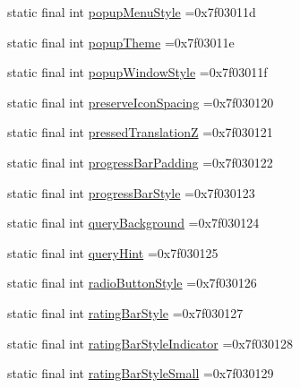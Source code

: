 \begin{DoxyCompactItemize}
static final int \mbox{\hyperlink{classbr_1_1unb_1_1cic_1_1mp_1_1marketmaster_1_1test_1_1R_1_1attr_a31141163efbb70b49e758ea0829678c7}{popup\+Menu\+Style}} =0x7f03011d
\item 
static final int \mbox{\hyperlink{classbr_1_1unb_1_1cic_1_1mp_1_1marketmaster_1_1test_1_1R_1_1attr_ab4ce4e708bd1618ab4450c0520b2eafc}{popup\+Theme}} =0x7f03011e
\item 
static final int \mbox{\hyperlink{classbr_1_1unb_1_1cic_1_1mp_1_1marketmaster_1_1test_1_1R_1_1attr_a7068a9f9cea2452a03b07a5722998fd0}{popup\+Window\+Style}} =0x7f03011f
\item 
static final int \mbox{\hyperlink{classbr_1_1unb_1_1cic_1_1mp_1_1marketmaster_1_1test_1_1R_1_1attr_acb92beeb6299acc38b42868c8224a136}{preserve\+Icon\+Spacing}} =0x7f030120
\item 
static final int \mbox{\hyperlink{classbr_1_1unb_1_1cic_1_1mp_1_1marketmaster_1_1test_1_1R_1_1attr_a21839aea61551cca7c6468522007cf95}{pressed\+TranslationZ}} =0x7f030121
\item 
static final int \mbox{\hyperlink{classbr_1_1unb_1_1cic_1_1mp_1_1marketmaster_1_1test_1_1R_1_1attr_ae4024ccde80bdce5df111599307e20d0}{progress\+Bar\+Padding}} =0x7f030122
\item 
static final int \mbox{\hyperlink{classbr_1_1unb_1_1cic_1_1mp_1_1marketmaster_1_1test_1_1R_1_1attr_a60222494b530e3e7eae4d72d368bd805}{progress\+Bar\+Style}} =0x7f030123
\item 
static final int \mbox{\hyperlink{classbr_1_1unb_1_1cic_1_1mp_1_1marketmaster_1_1test_1_1R_1_1attr_a4587f98d9242a7631809e2980f3784bd}{query\+Background}} =0x7f030124
\item 
static final int \mbox{\hyperlink{classbr_1_1unb_1_1cic_1_1mp_1_1marketmaster_1_1test_1_1R_1_1attr_a64155254f2c804c52758f19653f2394d}{query\+Hint}} =0x7f030125
\item 
static final int \mbox{\hyperlink{classbr_1_1unb_1_1cic_1_1mp_1_1marketmaster_1_1test_1_1R_1_1attr_af1e461d63715a1bb5a8d865e64f7f369}{radio\+Button\+Style}} =0x7f030126
\item 
static final int \mbox{\hyperlink{classbr_1_1unb_1_1cic_1_1mp_1_1marketmaster_1_1test_1_1R_1_1attr_a92a76fded489dec37980600043c7835b}{rating\+Bar\+Style}} =0x7f030127
\item 
static final int \mbox{\hyperlink{classbr_1_1unb_1_1cic_1_1mp_1_1marketmaster_1_1test_1_1R_1_1attr_a7b7123c7a21ddff6e1e218e2c028d337}{rating\+Bar\+Style\+Indicator}} =0x7f030128
\item 
static final int \mbox{\hyperlink{classbr_1_1unb_1_1cic_1_1mp_1_1marketmaster_1_1test_1_1R_1_1attr_ac61da0e9c8906967dbdbbd1163ef0f5e}{rating\+Bar\+Style\+Small}} =0x7f030129

\end{DoxyCompactItemize}

